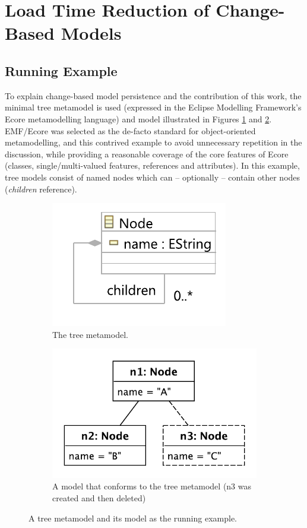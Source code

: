 \documentclass[12pt, a4paper]{report} \usepackage[titletoc]{appendix}
\begin{document}
\section{Load Time Reduction of Change-Based Models}
\label{sec:load_time_reduction_of_change-based_models}

\subsection{Running Example}
\label{subsec:case_study}
To explain change-based model persistence and the contribution of this work, the minimal tree metamodel is used (expressed in the Eclipse Modelling Framework's Ecore metamodelling language) and model illustrated in Figures \ref{fig:tree_metamodel} and \ref{fig:initial_model}.
EMF/Ecore was selected as the de-facto standard for object-oriented metamodelling, and this contrived example to avoid unnecessary repetition in the discussion, while providing a reasonable coverage of the core features of Ecore (classes, single/multi-valued features, references and attributes).
In this example, tree models consist of named nodes which can -- optionally -- contain other nodes (\emph{children} reference).

\begin{figure}[ht]
	\begin{subfigure}[t]{0.4\linewidth}
		\centering
		\includegraphics[width=0.8\linewidth]{node_metamodel}
		\caption{The tree metamodel.}
		\label{fig:tree_metamodel}
	\end{subfigure}
	\hfill
	\begin{subfigure}[t]{0.6\linewidth}
		\centering
		\includegraphics[width=0.6\linewidth]{initial_chart}
		\caption{A model that conforms to the tree metamodel (n3 was created and then deleted)}
		\label{fig:initial_model}
	\end{subfigure}
	\caption{A tree metamodel and its model as the running example.}
	\label{fig:append_speed}
\end{figure}
\end{document}
